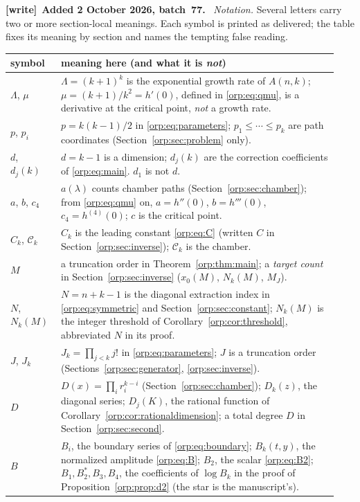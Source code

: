 \documentclass[11pt]{article}
\theoremstyle{remark}\newtheorem{remark}[theorem]{Remark}
\newenvironment{writenote}[1][]{\par\smallskip\begingroup\small
 \noindent\textbf{[write]}\if\relax\detokenize{#1}\relax\else~\textbf{#1.}\fi\ }%
 {\par\endgroup\smallskip}
\begin{document}
\begin{writenote}[Added 2 October 2026, batch~77]
\emph{Notation.} Several letters carry two or more section-local meanings.
Each symbol is printed as delivered; the table fixes its meaning by section
and names the tempting false reading.
\begin{center}\footnotesize
\begin{tabular}{@{}p{0.14\linewidth}p{0.80\linewidth}@{}}
\toprule
symbol & meaning here (and what it is \emph{not})\\
\midrule
$\Lambda$, $\mu$ & $\Lambda=(k+1)^k$ is the exponential growth rate of $A(n,k)$; $\mu=(k+1)/k^2=h'(0)$, defined in \eqref{orp:eq:qmu}, is a derivative at the critical point, \emph{not} a growth rate.\\
$p$, $p_i$ & $p=k(k-1)/2$ in \eqref{orp:eq:parameters}; $p_1\le\cdots\le p_k$ are path coordinates (Section~\ref{orp:sec:problem} only).\\
$d$, $d_j(k)$ & $d=k-1$ is a dimension; $d_j(k)$ are the correction coefficients of \eqref{orp:eq:main}. $d_1$ is not $d$.\\
$a$, $b$, $c_4$ & $a(\lambda)$ counts chamber paths (Section~\ref{orp:sec:chamber}); from \eqref{orp:eq:qmu} on, $a=h''(0)$, $b=h'''(0)$, $c_4=h^{(4)}(0)$; $c$ is the critical point.\\
$C_k$, $\mathcal C_k$ & $C_k$ is the leading constant \eqref{orp:eq:C} (written $C$ in Section~\ref{orp:sec:inverse}); $\mathcal C_k$ is the chamber.\\
$M$ & a truncation order in Theorem~\ref{orp:thm:main}; a \emph{target count} in Section~\ref{orp:sec:inverse} ($x_0(M)$, $N_k(M)$, $M_J$).\\
$N$, $N_k(M)$ & $N=n+k-1$ is the diagonal extraction index in \eqref{orp:eq:symmetric} and Section~\ref{orp:sec:constant}; $N_k(M)$ is the integer threshold of Corollary~\ref{orp:cor:threshold}, abbreviated $N$ in its proof.\\
$J$, $J_k$ & $J_k=\prod_{j<k}j!$ in \eqref{orp:eq:parameters}; $J$ is a truncation order (Sections~\ref{orp:sec:generator}, \ref{orp:sec:inverse}).\\
$D$ & $D(x)=\prod_ir_i^{k-i}$ (Section~\ref{orp:sec:chamber}); $D_k(z)$, the diagonal series; $D_j(K)$, the rational function of Corollary~\ref{orp:cor:rationaldimension}; a total degree $D$ in Section~\ref{orp:sec:second}.\\
$B$ & $B_i$, the boundary series of \eqref{orp:eq:boundary}; $B_k(t,y)$, the normalized amplitude \eqref{orp:eq:B}; $B_2$, the scalar \eqref{orp:eq:B2}; $B_1,B_2^*,B_3,B_4$, the coefficients of $\log B_k$ in the proof of Proposition~\ref{orp:prop:d2} (the star is the manuscript's).\\

\end{tabular}
\end{center}
\end{writenote}
\end{document}
